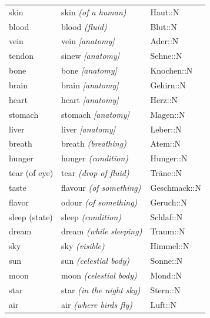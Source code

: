 \begin{center}
\begin{longtable}{lll}
{\sc \lowercase{	SKIN	}}	&	skin	\textit{\footnotesize (of a human)}	&	Haut::N	\\
{\sc \lowercase{	BLOOD	}}	&	blood	\textit{\footnotesize (fluid)}	&	Blut::N	\\
{\sc \lowercase{	VEIN	}}	&	vein	\textit{\footnotesize [anatomy]}	&	Ader::N	\\
{\sc \lowercase{	TENDON	}}	&	sinew	\textit{\footnotesize [anatomy]}	&	Sehne::N	\\
{\sc \lowercase{	BONE	}}	&	bone	\textit{\footnotesize [anatomy]}	&	Knochen::N	\\
{\sc \lowercase{	BRAIN	}}	&	brain	\textit{\footnotesize [anatomy]}	&	Gehirn::N	\\
{\sc \lowercase{	HEART	}}	&	heart	\textit{\footnotesize [anatomy]}	&	Herz::N	\\
{\sc \lowercase{	STOMACH	}}	&	stomach	\textit{\footnotesize [anatomy]}	&	Magen::N	\\
{\sc \lowercase{	LIVER	}}	&	liver	\textit{\footnotesize [anatomy]}	&	Leber::N	\\
{\sc \lowercase{	BREATH	}}	&	breath	\textit{\footnotesize (breathing)}	&	Atem::N	\\
{\sc \lowercase{	HUNGER	}}	&	hunger	\textit{\footnotesize (condition)}	&	Hunger::N	\\
{\sc \lowercase{	TEAR \footnotesize (OF EYE)	}}	&	tear	\textit{\footnotesize (drop of fluid)}	&	Träne::N	\\
{\sc \lowercase{	TASTE	}}	&	flavour	\textit{\footnotesize (of something)}	&	Geschmack::N	\\
{\sc \lowercase{	FLAVOR	}}	&	odour	\textit{\footnotesize (of something)}	&	Geruch::N	\\
{\sc \lowercase{	SLEEP \footnotesize (STATE)	}}	&	sleep	\textit{\footnotesize (condition)}	&	Schlaf::N	\\
{\sc \lowercase{	DREAM	}}	&	dream	\textit{\footnotesize (while sleeping)}	&	Traum::N	\\
{\sc \lowercase{	SKY	}}	&	sky	\textit{\footnotesize (visible)}	&	Himmel::N	\\
{\sc \lowercase{	SUN	}}	&	sun	\textit{\footnotesize (celestial body)}	&	Sonne::N	\\
{\sc \lowercase{	MOON	}}	&	moon	\textit{\footnotesize (celestial body)}	&	Mond::N	\\
{\sc \lowercase{	STAR	}}	&	star	\textit{\footnotesize (in the night sky)}	&	Stern::N	\\
{\sc \lowercase{	AIR	}}	&	air	\textit{\footnotesize (where birds fly)}	&	Luft::N	\\

\end{longtable}
\end{center}
